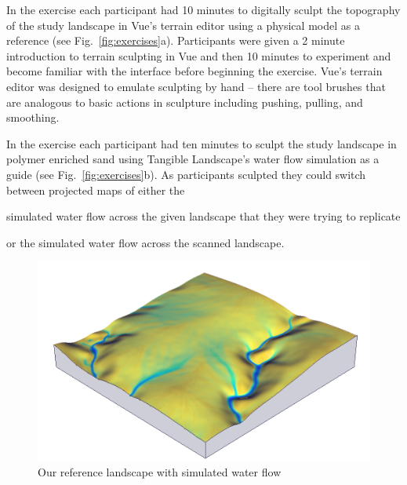 \documentclass{isprs}
\begin{document}

In the  exercise 
each participant had 10 minutes to digitally sculpt the topography of the study landscape in Vue's terrain editor
using a physical model as a reference (see Fig.~\ref{fig:exercises}a).
Participants were given a 2 minute introduction to terrain sculpting in Vue and then 10 minutes to experiment and become familiar with the interface before beginning the exercise. Vue's terrain editor was designed to emulate sculpting by hand -- there are tool brushes that are analogous to basic actions in sculpture including pushing, pulling, and smoothing. 

In the  exercise each participant had ten minutes to  
sculpt the study landscape in polymer enriched sand
using Tangible Landscape's water flow simulation
as a guide (see Fig.~\ref{fig:exercises}b). 
%
As participants sculpted they could switch between projected maps of either the
\begin{enumerate*}[label=\alph*),font=\itshape]
\item simulated water flow across the given landscape that they were trying to replicate
\item or the simulated water flow across the scanned landscape.
\end{enumerate*}

\begin{figure}[ht!]
\begin{center}
\includegraphics[width=1.0\columnwidth]{figures/depth_3d.png}
\caption{Our reference landscape with simulated water flow}
\label{fig:study_area}
\end{center}
\end{figure}
\end{document}
